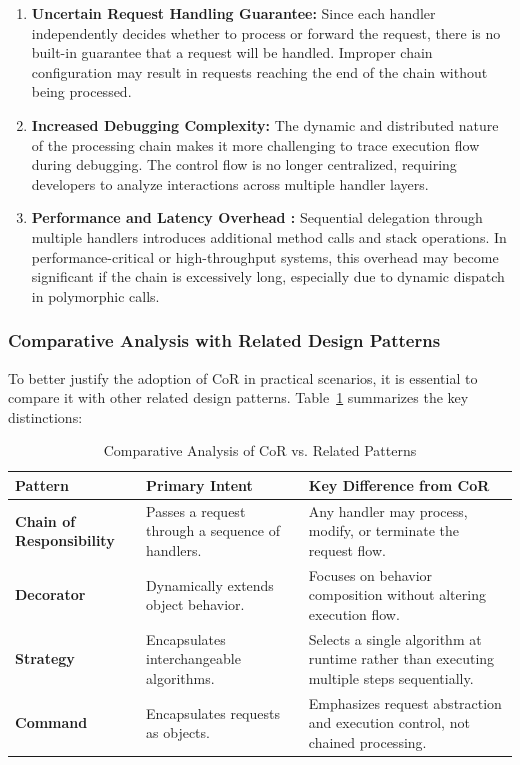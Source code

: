 \begin{enumerate}
    \item \textbf{Uncertain Request Handling Guarantee:} Since each handler independently decides whether to process or forward the request, there is no built-in guarantee that a request will be handled. Improper chain configuration may result in requests reaching the end of the chain without being processed.
    
    \item \textbf{Increased Debugging Complexity:} The dynamic and distributed nature of the processing chain makes it more challenging to trace execution flow during debugging. The control flow is no longer centralized, requiring developers to analyze interactions across multiple handler layers.
    
    \item \textbf{Performance and Latency Overhead \cite{meyers2005effective}:} Sequential delegation through multiple handlers introduces additional method calls and stack operations. In performance-critical or high-throughput systems, this overhead may become significant if the chain is excessively long, especially due to dynamic dispatch in polymorphic calls.
\end{enumerate}

\subsubsection{Comparative Analysis with Related Design Patterns}
To better justify the adoption of CoR in practical scenarios, it is essential to compare it with other related design patterns. Table~\ref{tab:pattern_comparison} summarizes the key distinctions:

\begin{table}[H]
    \centering
    \caption{Comparative Analysis of CoR vs. Related Patterns}
    \label{tab:pattern_comparison}
    \small
    \begin{tabularx}{\linewidth}{l X X}
        \hline
        \textbf{Pattern} & \textbf{Primary Intent} & \textbf{Key Difference from CoR} \\
        \hline
        \textbf{Chain of Responsibility} & Passes a request through a sequence of handlers. & Any handler may process, modify, or terminate the request flow. \\
        \textbf{Decorator} & Dynamically extends object behavior. & Focuses on behavior composition without altering execution flow. \\
        \textbf{Strategy} & Encapsulates interchangeable algorithms. & Selects a single algorithm at runtime rather than executing multiple steps sequentially. \\
        \textbf{Command} & Encapsulates requests as objects. & Emphasizes request abstraction and execution control, not chained processing. \\
        \hline
    \end{tabularx}
\end{table}

